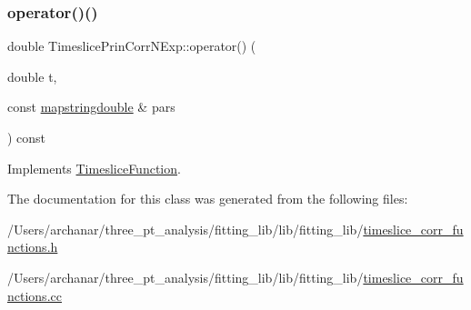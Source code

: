 \subsubsection{\texorpdfstring{operator()()}{operator()()}\hspace{0.1cm}{\footnotesize\ttfamily [4/4]}}
{\footnotesize\ttfamily double Timeslice\+Prin\+Corr\+N\+Exp\+::operator() (\begin{DoxyParamCaption}\item[{double}]{t,  }\item[{const \mbox{\hyperlink{lib_2fitting__lib_2includes_8h_a647b481c557c7966517f753340a81d13}{mapstringdouble}} \&}]{pars }\end{DoxyParamCaption}) const\hspace{0.3cm}{\ttfamily [virtual]}}



Implements \mbox{\hyperlink{classTimesliceFunction_a0a71b38a0008247e9ed3726b466132c3}{Timeslice\+Function}}.



The documentation for this class was generated from the following files\+:\begin{DoxyCompactItemize}
\item 
/\+Users/archanar/three\+\_\+pt\+\_\+analysis/fitting\+\_\+lib/lib/fitting\+\_\+lib/\mbox{\hyperlink{lib_2fitting__lib_2timeslice__corr__functions_8h}{timeslice\+\_\+corr\+\_\+functions.\+h}}\item 
/\+Users/archanar/three\+\_\+pt\+\_\+analysis/fitting\+\_\+lib/lib/fitting\+\_\+lib/\mbox{\hyperlink{timeslice__corr__functions_8cc}{timeslice\+\_\+corr\+\_\+functions.\+cc}}\end{DoxyCompactItemize}
